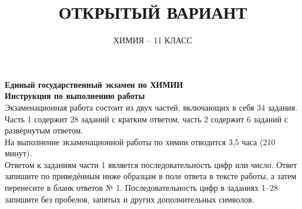\documentclass[10pt,a4paper,twocolumn,landscape]{article}
\title{\qrcode[height=1cm]{https://fourgia.t.me/} \textsf{ОТКРЫТЫЙ ВАРИАНТ}}
\author{\textsf{ХИМИЯ -- 11 КЛАСС}}
\newcommand{\sepline}{\vspace{1em}}
\begin{document}
\begin{center}
	\textsf{\textbf{Единый государственный экзамен по ХИМИИ \\
	Инструкция по выполнению работы \\}}
	\sepline
	Экзаменационная работа состоит из двух частей, включающих в себя
34 задания. Часть 1 содержит 28 заданий с кратким ответом, часть 2
содержит 6 заданий с развёрнутым ответом. \\
На выполнение экзаменационной работы по химии отводится 3,5 часа
(210 минут). \\
Ответом к заданиям части 1 является последовательность цифр или
число. Ответ запишите по приведённым ниже образцам в поле ответа
в тексте работы, а затем перенесите в бланк ответов № 1.
Последовательность цифр в заданиях 1–28 запишите без пробелов, запятых
и других дополнительных символов. \\


\end{center}
\end{document}

